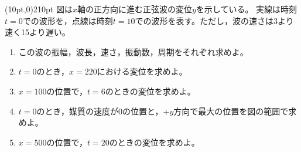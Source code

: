 \hakosyokika
\item
    \begin{mawarikomi}(10pt,0){210pt}{}
        図は$x$軸の正方向に進む正弦波の変位$y$を示している。
        実線は時刻$t=0$での波形を，点線は時刻$t=10$での波形を表す。ただし，波の速さは3より速く15より遅い。
        \begin{enumerate}
            \item この波の振幅，波長，速さ，振動数，周期をそれぞれ求めよ。
            \item $t=0$のとき，$x=220$における変位を求めよ。
            \item $x=100$の位置で，$t=6$のときの変位を求めよ。
            \item $t=0$のとき，媒質の速度が0の位置と，$+y$方向で最大の位置を図の範囲で求めよ。
            \item $x=500$の位置で，$t=20$のときの変位を求めよ。
        \end{enumerate}
    \end{mawarikomi}